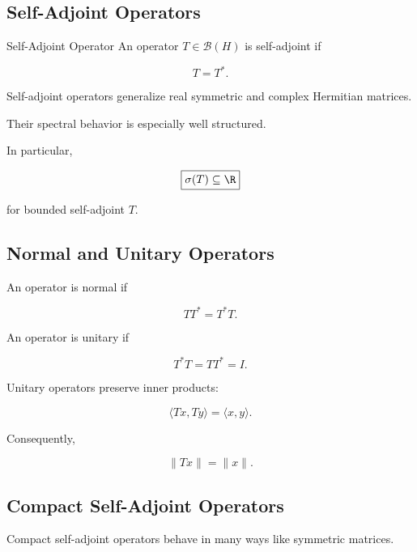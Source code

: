\subsection{Self-Adjoint Operators}
\label{subsec:self-adjoint-operators}

\begin{definitionbox}{Self-Adjoint Operator}
An operator \(T\in\mathcal{B}(H)\) is self-adjoint if

\[
\boxed{
T=T^*.
}
\]
\end{definitionbox}

Self-adjoint operators generalize real symmetric and complex Hermitian
matrices.

Their spectral behavior is especially well structured.

In particular,

\[
\boxed{
\sigma(T)\subseteq\R
}
\]

for bounded self-adjoint \(T\).

\subsection{Normal and Unitary Operators}
\label{subsec:normal-unitary-operators}

An operator is normal if

\[
\boxed{
TT^*=T^*T.
}
\]

An operator is unitary if

\[
\boxed{
T^*T=TT^*=I.
}
\]

Unitary operators preserve inner products:

\[
\boxed{
\langle Tx,Ty\rangle
=
\langle x,y\rangle.
}
\]

Consequently,

\[
\boxed{
\|Tx\|=\|x\|.
}
\]

\subsection{Compact Self-Adjoint Operators}
\label{subsec:compact-self-adjoint}

Compact self-adjoint operators behave in many ways like symmetric
matrices.

